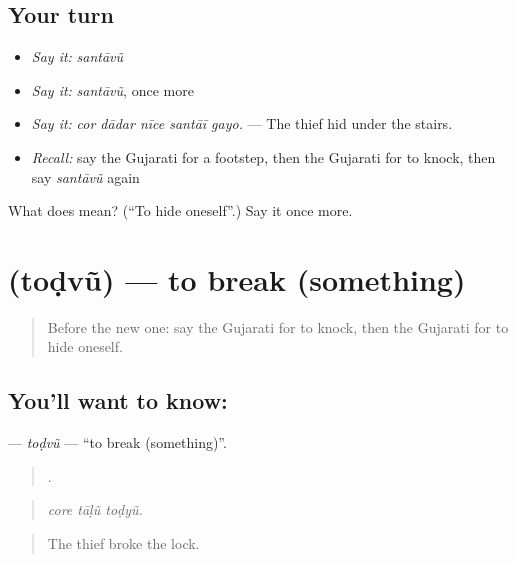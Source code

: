 \subsection*{Your turn}
\begin{itemize}
\raggedright
  \item \emph{Say it:} \emph{santāvũ}
  \item \emph{Say it:} \emph{santāvũ}, once more
  \item \emph{Say it:} \emph{cor dādar nīce santāī gayo.} — The thief hid under the stairs.
  \item \emph{Recall:} say the Gujarati for a footstep, then the Gujarati for to knock, then say \emph{santāvũ} again
\end{itemize}

\begin{tcolorbox}[breakable,colback=teal!4,colframe=teal!35!black,title={Before you move on}]
What does  mean? (\textquotedblleft{}To hide oneself\textquotedblright{}.) Say it once more.
\end{tcolorbox}
\section[\texorpdfstring{\gu{તોડવું} (toḍvũ)}{તોડવું (toḍvũ)}]{ (toḍvũ) — to break (something)}

\label{lesson:GU-C287-todvu}



\begin{quote}
Before the new one: say the Gujarati for to knock, then the Gujarati for to hide oneself.
\end{quote}

\subsection*{You'll want to know: }
\textbf{} — \emph{toḍvũ} — \textquotedblleft{}to break (something)\textquotedblright{}.

\begin{quote}
  .
\end{quote}

\begin{quote}
\emph{core tāḷũ toḍyũ.}
\end{quote}

\begin{quote}
The thief broke the lock.
\end{quote}

